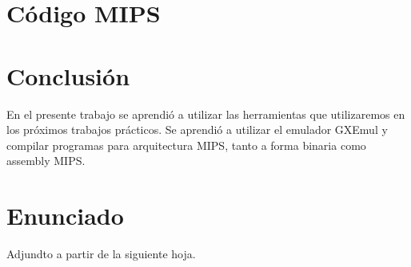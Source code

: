 

\bigskip

\section{Código MIPS}



\bigskip

%

\section{Conclusión}
     En el presente trabajo se aprendió a utilizar las herramientas que utilizaremos en los próximos trabajos prácticos. 
     Se aprendió a utilizar el emulador GXEmul y compilar programas para arquitectura MIPS, tanto a forma binaria como assembly MIPS.

\section{Enunciado}

Adjundto a partir de la siguiente hoja.




